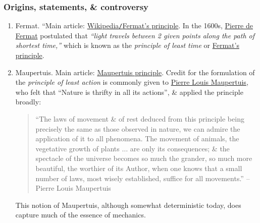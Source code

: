 \documentclass{article}
\begin{document}
\subsubsection{Origins, statements, \& controversy}

\begin{enumerate}
	\item {\sc Fermat.} ``Main article: \href{https://en.wikipedia.org/wiki/Fermat%27s_principle}{Wikipedia{\tt/}Fermat's principle}. In the 1600s, \href{https://en.wikipedia.org/wiki/Pierre_de_Fermat}{Pierre de Fermat} postulated that \textit{``light travels between 2 given points along the path of shortest time,''} which is known as the \textit{principle of least time} or \href{https://en.wikipedia.org/wiki/Fermat%27s_principle}{Fermat's principle}.
	\item {\sc Maupertuis.} Main article: \href{https://en.wikipedia.org/wiki/Maupertuis_principle}{Maupertuis principle}. Credit for the formulation of the \textit{principle of least action} is commonly given to \href{https://en.wikipedia.org/wiki/Pierre_Louis_Maupertuis}{Pierre Louis Maupertuis}, who felt that ``Nature is thrifty in all its actions'', \& applied the principle broadly:
	\begin{quotation}
		``The laws of movement \& of rest deduced from this principle being precisely the same as those observed in nature, we can admire the application of it to all phenomena. The movement of animals, the vegetative growth of plants $\ldots$ are only its consequences; \& the spectacle of the universe becomes so much the grander, so much more beautiful, the worthier of its Author, when one knows that a small number of laws, most wisely established, suffice for all movements.'' -- Pierre Louis Maupertuis
	\end{quotation}
	This notion of Maupertuis, although somewhat deterministic today, does capture much of the essence of mechanics.
	

\end{enumerate}
\end{document}
